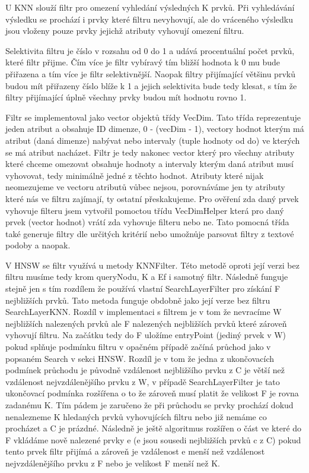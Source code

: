 \documentclass[czech,semestral,dept460,male,csharp,cpdeclaration]{diploma}
\begin{document}
		U KNN slouží filtr pro omezení vyhledání výsledných K prvků. Při vyhledávání výsledku se prochází i prvky které filtru nevyhovují, ale do vráceného výsledku jsou vloženy pouze prvky jejichž atributy vyhovují omezení filtru.
		
		Selektivita filtru je číslo v rozsahu od 0 do 1 a udává procentuální počet prvků, které filtr přijme. Čím více je filtr vybíravý tím bližší hodnota k 0 mu bude přiřazena a tím více je filtr selektivnější. Naopak filtry přijímající většinu prvků budou mít přiřazeny číslo blíže k 1 a jejich selektivita bude tedy klesat, s tím že filtry přijímající úplně všechny prvky budou mít hodnotu rovno 1.
		
		Filtr se implementoval jako vector objektů třídy VecDim. Tato třída reprezentuje jeden atribut a obsahuje ID dimenze, 0 - (vecDim - 1), vectory hodnot kterým má atribut (daná dimenze) nabývat nebo intervaly (tuple hodnoty od do) ve kterých se má atribut nacházet. Filtr je tedy nakonec vector který pro všechny atributy které chceme omezovat obsahuje hodnoty a intervaly kterým daná atribut musí vyhovovat, tedy minimálně jedné z těchto hodnot. Atributy které nijak neomezujeme ve vectoru atributů vůbec nejsou, porovnáváme jen ty atributy které nás ve filtru zajímají, ty ostatní přeskakujeme. Pro ověření zda daný prvek vyhovuje filteru jsem vytvořil pomoctou třídu VecDimHelper která pro daný prvek (vector hodnot) vrátí zda vyhovuje filteru nebo ne. Tato pomocná třída také generuje filtry dle určitých kritérií nebo umožnůje parsovat filtry z textové podoby a naopak.
		
		V HNSW se filtr využívá u metody KNNFilter. Této metodě oproti její verzi bez filtru musíme tedy krom queryNodu, K a Ef i samotný filtr. Následně funguje stejně jen s tím rozdílem že používá vlastní SearchLayerFilter pro získání F nejbližších prvků. Tato metoda funguje obdobně jako její verze bez filtru SearchLayerKNN. Rozdíl v implementaci s filtrem je v tom že nevracíme W nejbližších nalezených prvků ale F nalezených nejbližších prvků které zároveň vyhovují filtru. Na začátku tedy do F uložíme entryPoint (jediný prvek v W) pokud splňuje podmínku filtru v opačném případě začíná průchod jako v popsaném Search v sekci HNSW. Rozdíl je v tom že jedna z ukončovacích podmínek průchodu je původně vzdálenost nejbližšího prvku z C je větší než vzdálenost nejvzdálenějšího prvku z W, v případě SearchLayerFilter je tato ukončovací podmínka rozšířena o to že zároveň musí platit že velikost F je rovna zadanému K. Tím pádem je zaručeno že při průchodu se prvky prochází dokud nenalezneme K hledaných prvků vyhovujících filtru nebo již nemáme co procházet a C je prázdné. Následně je ještě algoritmus rozšířen o část ve které do F vkládáme nově nalezené prvky e (e jsou sousedi nejbližších prvků c z C) pokud tento prvek filtr přijímá a zároveň je vzdálenost e menší než vzdálenost nejvzdálenějšího prvku z F nebo je velikost F menší než K.
		
\end{document}
